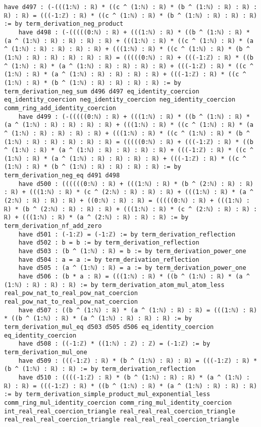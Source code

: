 \documentclass{article}
\begin{document}
\begin{tcolorbox}[colback=white!10, width=\linewidth]
\begin{lstlisting}[language=Lean4]
    have d497 : (-(((1:ℕ) : ℝ) * ((c ^ (1:ℕ) : ℝ) * (b ^ (1:ℕ) : ℝ) : ℝ) : ℝ) : ℝ) = (((-1:ℤ) : ℝ) * ((c ^ (1:ℕ) : ℝ) * (b ^ (1:ℕ) : ℝ) : ℝ) : ℝ) := by term_derivation_neg_product
    have d498 : (-(((((0:ℕ) : ℝ) + (((1:ℕ) : ℝ) * ((b ^ (1:ℕ) : ℝ) * (a ^ (1:ℕ) : ℝ) : ℝ) : ℝ) : ℝ) + (((1:ℕ) : ℝ) * ((c ^ (1:ℕ) : ℝ) * (a ^ (1:ℕ) : ℝ) : ℝ) : ℝ) : ℝ) + (((1:ℕ) : ℝ) * ((c ^ (1:ℕ) : ℝ) * (b ^ (1:ℕ) : ℝ) : ℝ) : ℝ) : ℝ) : ℝ) = (((((0:ℕ) : ℝ) + (((-1:ℤ) : ℝ) * ((b ^ (1:ℕ) : ℝ) * (a ^ (1:ℕ) : ℝ) : ℝ) : ℝ) : ℝ) + (((-1:ℤ) : ℝ) * ((c ^ (1:ℕ) : ℝ) * (a ^ (1:ℕ) : ℝ) : ℝ) : ℝ) : ℝ) + (((-1:ℤ) : ℝ) * ((c ^ (1:ℕ) : ℝ) * (b ^ (1:ℕ) : ℝ) : ℝ) : ℝ) : ℝ) := by term_derivation_neg_sum d496 d497 eq_identity_coercion eq_identity_coercion neg_identity_coercion neg_identity_coercion comm_ring_add_identity_coercion
    have d499 : (-(((((0:ℕ) : ℝ) + (((1:ℕ) : ℝ) * ((b ^ (1:ℕ) : ℝ) * (a ^ (1:ℕ) : ℝ) : ℝ) : ℝ) : ℝ) + (((1:ℕ) : ℝ) * ((c ^ (1:ℕ) : ℝ) * (a ^ (1:ℕ) : ℝ) : ℝ) : ℝ) : ℝ) + (((1:ℕ) : ℝ) * ((c ^ (1:ℕ) : ℝ) * (b ^ (1:ℕ) : ℝ) : ℝ) : ℝ) : ℝ) : ℝ) = (((((0:ℕ) : ℝ) + (((-1:ℤ) : ℝ) * ((b ^ (1:ℕ) : ℝ) * (a ^ (1:ℕ) : ℝ) : ℝ) : ℝ) : ℝ) + (((-1:ℤ) : ℝ) * ((c ^ (1:ℕ) : ℝ) * (a ^ (1:ℕ) : ℝ) : ℝ) : ℝ) : ℝ) + (((-1:ℤ) : ℝ) * ((c ^ (1:ℕ) : ℝ) * (b ^ (1:ℕ) : ℝ) : ℝ) : ℝ) : ℝ) := by term_derivation_neg_eq d491 d498
    have d500 : ((((((0:ℕ) : ℝ) + (((1:ℕ) : ℝ) * (b ^ (2:ℕ) : ℝ) : ℝ) : ℝ) + (((1:ℕ) : ℝ) * (c ^ (2:ℕ) : ℝ) : ℝ) : ℝ) + (((1:ℕ) : ℝ) * (a ^ (2:ℕ) : ℝ) : ℝ) : ℝ) + ((0:ℕ) : ℝ) : ℝ) = (((((0:ℕ) : ℝ) + (((1:ℕ) : ℝ) * (b ^ (2:ℕ) : ℝ) : ℝ) : ℝ) + (((1:ℕ) : ℝ) * (c ^ (2:ℕ) : ℝ) : ℝ) : ℝ) + (((1:ℕ) : ℝ) * (a ^ (2:ℕ) : ℝ) : ℝ) : ℝ) := by term_derivation_nf_add_zero
    have d501 : (-1:ℤ) = (-1:ℤ) := by term_derivation_reflection
    have d502 : b = b := by term_derivation_reflection
    have d503 : (b ^ (1:ℕ) : ℝ) = b := by term_derivation_power_one
    have d504 : a = a := by term_derivation_reflection
    have d505 : (a ^ (1:ℕ) : ℝ) = a := by term_derivation_power_one
    have d506 : (b * a : ℝ) = (((1:ℕ) : ℝ) * ((b ^ (1:ℕ) : ℝ) * (a ^ (1:ℕ) : ℝ) : ℝ) : ℝ) := by term_derivation_atom_mul_atom_less real_pow_nat_to_real_pow_nat_coercion real_pow_nat_to_real_pow_nat_coercion
    have d507 : ((b ^ (1:ℕ) : ℝ) * (a ^ (1:ℕ) : ℝ) : ℝ) = (((1:ℕ) : ℝ) * ((b ^ (1:ℕ) : ℝ) * (a ^ (1:ℕ) : ℝ) : ℝ) : ℝ) := by term_derivation_mul_eq d503 d505 d506 eq_identity_coercion eq_identity_coercion
    have d508 : ((-1:ℤ) * ((1:ℕ) : ℤ) : ℤ) = (-1:ℤ) := by term_derivation_mul_one
    have d509 : (((-1:ℤ) : ℝ) * (b ^ (1:ℕ) : ℝ) : ℝ) = (((-1:ℤ) : ℝ) * (b ^ (1:ℕ) : ℝ) : ℝ) := by term_derivation_reflection
    have d510 : ((((-1:ℤ) : ℝ) * (b ^ (1:ℕ) : ℝ) : ℝ) * (a ^ (1:ℕ) : ℝ) : ℝ) = (((-1:ℤ) : ℝ) * ((b ^ (1:ℕ) : ℝ) * (a ^ (1:ℕ) : ℝ) : ℝ) : ℝ) := by term_derivation_simple_product_mul_exponential_less comm_ring_mul_identity_coercion comm_ring_mul_identity_coercion int_real_real_coercion_triangle real_real_real_coercion_triangle real_real_real_coercion_triangle real_real_real_coercion_triangle

\end{lstlisting}
\end{tcolorbox}
\end{document}
